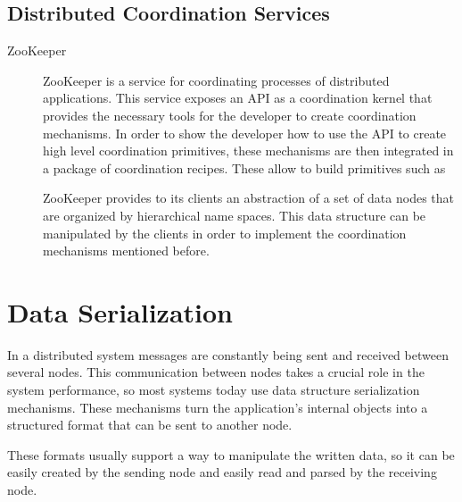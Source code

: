 \subsection{Distributed Coordination Services}

\begin{description}

\item[ZooKeeper ~\cite{zookeeper}] ZooKeeper is a service for coordinating processes of distributed applications. This service exposes an API as a coordination kernel that provides the necessary tools for the developer to create coordination mechanisms. In order to show the developer how to use the API to create high level coordination primitives, these mechanisms are then integrated in a package of coordination recipes. These allow to build primitives such as 
\par
	ZooKeeper provides to its clients an abstraction of a set of data nodes that are organized by hierarchical name spaces. This data structure can be manipulated by the clients in order to implement the coordination mechanisms mentioned before.

\end{description}

\section{Data Serialization}
\label{sec:data_serialization}

In a distributed system messages are constantly being sent and received between several nodes. This communication between nodes takes a crucial role in the system performance\cite{serialization}, so most systems today use data structure serialization mechanisms. These mechanisms turn the application's internal objects into a structured format that can be sent to another node.\par
	These formats usually support a way to manipulate the written data, so it can be easily created by the sending node and easily read and parsed by the receiving node.

